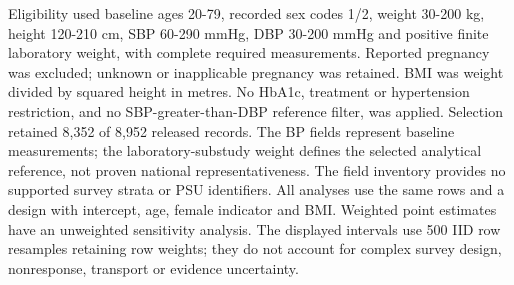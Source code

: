 \documentclass[11pt,letterpaper]{article}
\begin{document}
Eligibility used baseline ages 20-79, recorded sex codes 1/\allowbreak{}2, weight 30-200 kg, height 120-210 cm, SBP 60-290 mmHg, DBP 30-200 mmHg and positive finite laboratory weight, with complete required measurements. Reported pregnancy was excluded; unknown or inapplicable pregnancy was retained. BMI was weight divided by squared height in metres. No HbA1c, treatment or hypertension restriction, and no SBP-greater-than-DBP reference filter, was applied. Selection retained 8,352 of 8,952 released records. The BP fields represent baseline measurements; the laboratory-substudy weight defines the selected analytical reference, not proven national representativeness. The field inventory provides no supported survey strata or PSU identifiers. All analyses use the same rows and a design with intercept, age, female indicator and BMI. Weighted point estimates have an unweighted sensitivity analysis. The displayed intervals use 500 IID row resamples retaining row weights; they do not account for complex survey design, nonresponse, transport or evidence uncertainty.


\FloatBarrier

\begingroup

\small

\renewcommand{\arraystretch}{1.22}
\end{document}
